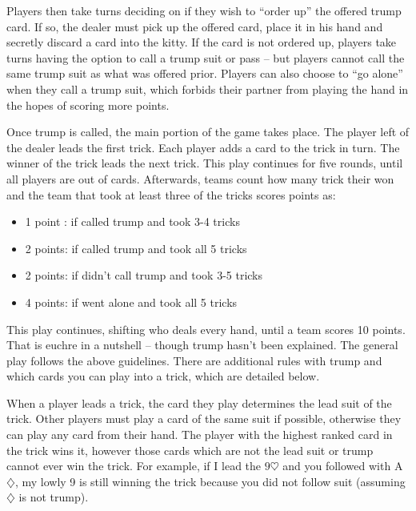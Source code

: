 Players then take turns deciding on if they wish to ``order up'' the offered trump card. If so, the dealer must pick up the offered card,
place it in his hand and secretly discard a card into the kitty. If the card is not ordered up, players take turns having the option to
call a trump suit or pass -- but players cannot call the same trump suit as what was offered prior. Players can also choose to ``go alone''
when they call a trump suit, which forbids their partner from playing the hand in the hopes of scoring more points.

Once trump is called, the main portion of the game takes place. The player left of the dealer leads the first trick. Each player adds a card
to the trick in turn. The winner of the trick leads the next trick. This play continues for five rounds, until all players are out of cards.
Afterwards, teams count how many trick their won and the team that took at least three of the tricks scores points as:
\begin{itemize}[noitemsep, label={}]
    \item 1 point : if called trump and took 3-4 tricks
    \item 2 points: if called trump and took all 5 tricks
    \item 2 points: if didn't call trump and took 3-5 tricks
    \item 4 points: if went alone and took all 5 tricks
\end{itemize}

This play continues, shifting who deals every hand, until a team scores 10 points. That is euchre in a nutshell -- though trump hasn't been explained.
The general play follows the above guidelines. There are additional rules with trump and which cards you can play into a trick, which are detailed below.

When a player leads a trick, the card they play determines the lead suit of the trick. Other players must play a card of the same suit
if possible, otherwise they can play any card from their hand. The player with the highest ranked card in the trick wins it, however those cards
which are not the lead suit or trump cannot ever win the trick. For example, if I lead the $9\heartsuit$ and you followed with A$\diamondsuit$, my
lowly 9 is still winning the trick because you did not follow suit (assuming $\diamondsuit$ is not trump).

